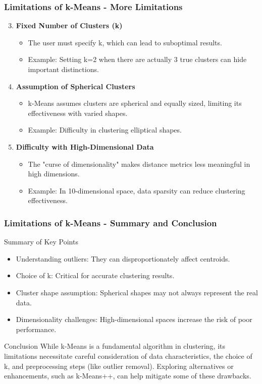 \documentclass[aspectratio=169]{beamer}
\begin{document}
\begin{frame}[fragile]
    \frametitle{Limitations of k-Means - More Limitations}
    \begin{enumerate}
        \setcounter{enumi}{2}
        \item \textbf{Fixed Number of Clusters (k)}
            \begin{itemize}
                \item The user must specify k, which can lead to suboptimal results.
                \item Example: Setting k=2 when there are actually 3 true clusters can hide important distinctions.
            \end{itemize}
        \item \textbf{Assumption of Spherical Clusters}
            \begin{itemize}
                \item k-Means assumes clusters are spherical and equally sized, limiting its effectiveness with varied shapes.
                \item Example: Difficulty in clustering elliptical shapes.
            \end{itemize}
        \item \textbf{Difficulty with High-Dimensional Data}
            \begin{itemize}
                \item The "curse of dimensionality" makes distance metrics less meaningful in high dimensions.
                \item Example: In 10-dimensional space, data sparsity can reduce clustering effectiveness.
            \end{itemize}
    \end{enumerate}
\end{frame}

\begin{frame}[fragile]
    \frametitle{Limitations of k-Means - Summary and Conclusion}
    \begin{block}{Summary of Key Points}
        \begin{itemize}
            \item Understanding outliers: They can disproportionately affect centroids.
            \item Choice of k: Critical for accurate clustering results.
            \item Cluster shape assumption: Spherical shapes may not always represent the real data.
            \item Dimensionality challenges: High-dimensional spaces increase the risk of poor performance.
        \end{itemize}
    \end{block}
    \begin{block}{Conclusion}
        While k-Means is a fundamental algorithm in clustering, its limitations necessitate careful consideration of data characteristics, the choice of k, and preprocessing steps (like outlier removal). 
        Exploring alternatives or enhancements, such as k-Means++, can help mitigate some of these drawbacks.
    \end{block}
\end{frame}
\end{document}
